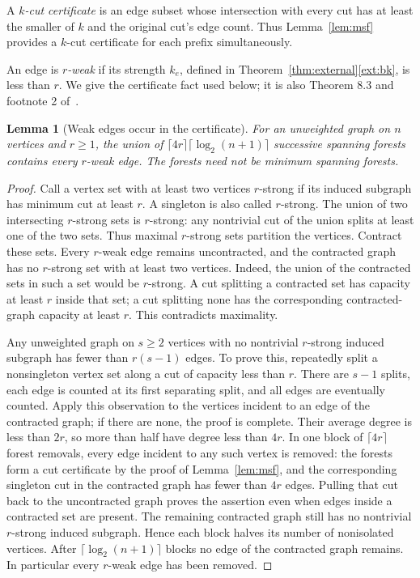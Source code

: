 \documentclass[11pt]{article}
\newtheorem{lemma}[theorem]{Lemma}
\theoremstyle{definition}
\begin{document}
A \emph{$k$-cut certificate} is an edge subset whose intersection with
every cut has at least the smaller of $k$ and the original cut's edge
count. Thus Lemma~\ref{lem:msf} provides a $k$-cut certificate for
each prefix simultaneously.

An edge is \emph{$r$-weak} if its strength $k_e$, defined in
Theorem~\ref{thm:external}\ref{ext:bk}, is less than $r$.
We give the certificate fact used below; it is also Theorem 8.3 and
footnote 2 of~\cite{BK15}.

\begin{lemma}[Weak edges occur in the certificate]\label{lem:weak}
For an unweighted graph on $n$ vertices and $r\ge1$, the union of
$\lceil4r\rceil\lceil\log_2(n+1)\rceil$ successive spanning forests
contains every $r$-weak edge. The forests need not be minimum spanning
forests.
\end{lemma}
\begin{proof}
Call a vertex set with at least two vertices $r$-strong if its induced
subgraph has minimum cut at least $r$. A singleton is also called
$r$-strong. The union of two intersecting $r$-strong sets is
$r$-strong: any nontrivial cut of the union splits at least one of
the two sets. Thus maximal $r$-strong sets partition the vertices.
Contract these sets. Every $r$-weak edge remains uncontracted, and
the contracted graph has no $r$-strong set with at least two vertices.
Indeed, the union of the contracted sets in such a set would be
$r$-strong. A cut splitting a contracted set has capacity at least
$r$ inside that set; a cut splitting none has the corresponding
contracted-graph capacity at least $r$. This contradicts maximality.

Any unweighted graph on $s\ge2$ vertices with no nontrivial $r$-strong
induced subgraph has fewer than $r(s-1)$ edges. To prove this, repeatedly
split a nonsingleton vertex set along a cut of capacity less than $r$.
There are $s-1$ splits, each edge is counted at its first separating
split, and all edges are eventually counted.
Apply this observation to the vertices incident to an edge of the
contracted graph; if there are none, the proof is complete.
Their average degree is less than $2r$, so more than half have degree
less than $4r$. In one block of $\lceil4r\rceil$ forest removals,
every edge incident to any such vertex is removed: the forests form
a cut certificate by the proof of Lemma~\ref{lem:msf}, and the
corresponding singleton cut in the contracted graph has fewer than $4r$ edges.
Pulling that cut back to the uncontracted graph proves the assertion
even when edges inside a contracted set are present. The remaining
contracted graph still has no nontrivial $r$-strong induced subgraph. Hence
each block halves its number of nonisolated vertices. After
$\lceil\log_2(n+1)\rceil$ blocks no edge of the contracted graph remains.
In particular every $r$-weak edge has been removed.
\end{proof}
\end{document}
